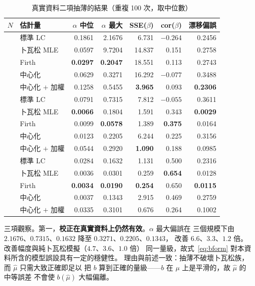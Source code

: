 \documentclass[UTF8, fontset=macnew, a4paper, 12pt]{ctexart}
\begin{document}
\begin{table}[H]
\centering
\caption{真實資料二項抽薄的結果（重複 100 次，取中位數）}
\small
\begin{tabular}{llrrrrr}
\toprule
$N$ & 估計量 & $\alpha$ 中位 & $\alpha$ 最大 & SSE($\beta$) & cor($\beta$) & 漂移偏誤\\
\midrule
{}
 & 標準 LC          & 0.1861 & 2.1676 & 6.731 & $-0.264$ & 0.2456\\
 & 卜瓦松 MLE       & 0.0597 & 9.7204 & 14.837 & 0.151 & 0.2758\\
 & Firth            & \textbf{0.0297} & \textbf{0.2047} & 18.551 & 0.113 & 0.2743\\
 & 中心化           & 0.0629 & 0.3271 & 16.292 & $-0.077$ & 0.3488\\
 & 中心化 $+$ 加權   & 0.1258 & 0.5455 & \textbf{3.965} & 0.093 & \textbf{0.2306}\\
\midrule
{}
 & 標準 LC          & 0.0791 & 0.7315 & 7.812 & $-0.055$ & 0.3611\\
 & 卜瓦松 MLE       & \textbf{0.0066} & 0.1804 & 1.591 & 0.343 & \textbf{0.0029}\\
 & Firth            & 0.0099 & \textbf{0.0578} & 1.389 & \textbf{0.375} & 0.0164\\
 & 中心化           & 0.0123 & 0.2205 & 6.244 & 0.225 & 0.3156\\
 & 中心化 $+$ 加權   & 0.0544 & 0.2920 & \textbf{1.090} & 0.188 & 0.0985\\
\midrule
{}
 & 標準 LC          & 0.0284 & 0.1632 & 1.131 & 0.500 & 0.2316\\
 & 卜瓦松 MLE       & 0.0036 & 0.0301 & 0.259 & \textbf{0.654} & 0.0128\\
 & Firth            & \textbf{0.0034} & \textbf{0.0190} & \textbf{0.254} & 0.650 & \textbf{0.0115}\\
 & 中心化           & 0.0037 & 0.1343 & 2.915 & 0.469 & 0.2759\\
 & 中心化 $+$ 加權   & 0.0335 & 0.3101 & 0.676 & 0.264 & 0.1002\\
\bottomrule
\end{tabular}
\label{tab:real}
\end{table}

三項觀察。第一，\textbf{校正在真實資料上仍然有效}。$\alpha$ 最大偏誤在
三個規模下由 $2.1676$、$0.7315$、$0.1632$ 降至 $0.3271$、$0.2205$、$0.1343$，
改善 $6.6$、$3.3$、$1.2$ 倍。改善幅度與純卜瓦松模擬（$4.7$、$3.6$、$1.0$ 倍）
同一量級，故式~\eqref{eq:bform} 對本資料所含的模型誤設具有一定的穩健性。
理由與前述一致：抽薄不破壞卜瓦松族，而 $\hat\mu$ 只需大致正確即足以
把 $b$ 算到正確的量級——$b$ 在 $\mu$ 上是平滑的，故 $\hat\mu$ 的中等誤差
不會使 $b(\hat\mu)$ 大幅偏離。
\end{document}
